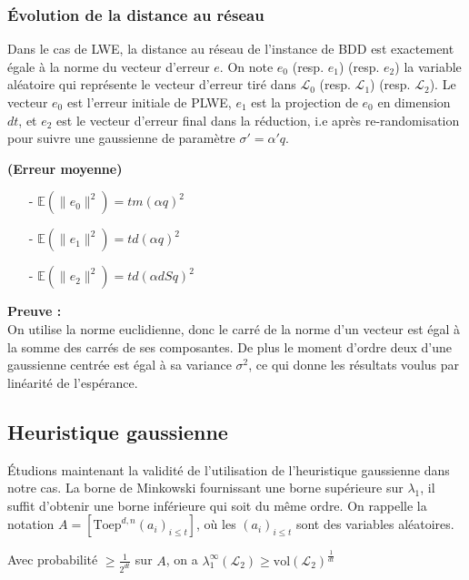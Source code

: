 \documentclass[11pt,a4paper]{article}
\begin{document}
\subsubsection{Évolution de la distance au réseau}

Dans le cas de LWE, la distance au réseau de l'instance de BDD est exactement égale à la norme du vecteur d'erreur $e$. On note $e_0$ (resp. $e_1$) (resp. $e_2$) la variable aléatoire qui représente le vecteur d'erreur tiré dans $\mathcal{L}_0$ (resp. $\mathcal{L}_1$) (resp. $\mathcal{L}_2$). Le vecteur $e_0$ est l'erreur initiale de PLWE, $e_1$ est la projection de $e_0$ en dimension $dt$, et $e_2$ est le vecteur d'erreur final dans la réduction, i.e après re-randomisation pour suivre une gaussienne de paramètre $\sigma' = \alpha' q$.
\begin{theorem}\textbf{(Erreur moyenne)}
\begin{itemize}
\item[-] $\mathbb{E}(\|e_0\|^2) = tm(\alpha q)^2 $
\item[-] $\mathbb{E}(\|e_1\|^2) = td(\alpha q)^2 $
\item[-] $\mathbb{E}(\|e_2\|^2) = td(\alpha d S q)^2$
\end{itemize}
\end{theorem}
\textbf{Preuve :} \\
On utilise la norme euclidienne, donc le carré de la norme d'un vecteur est égal à la somme des carrés de ses composantes. De plus le moment d'ordre deux d'une gaussienne centrée est égal à sa variance $\sigma^2$, ce qui donne les résultats voulus par linéarité de l'espérance.

\subsection{Heuristique gaussienne}

Étudions maintenant la validité de l'utilisation de l'heuristique gaussienne dans notre cas. La borne de Minkowski fournissant une borne supérieure sur $\lambda_1$, il suffit d'obtenir une borne inférieure qui soit du même ordre. On rappelle la notation $A=[\text{Toep}^{d,n}(a_i)_{i\leq t}]$, où les $(a_i)_{i\leq t}$ sont des variables aléatoires.

\begin{theorem} 
Avec probabilité $\displaystyle \geq \frac{1}{2^{dt}}$ sur $A$, on a $\lambda_1^\infty(\mathcal{L}_2) \geq \text{vol}(\mathcal{L}_2)^{\frac{1}{dt}}$
\end{theorem}
\end{document}
